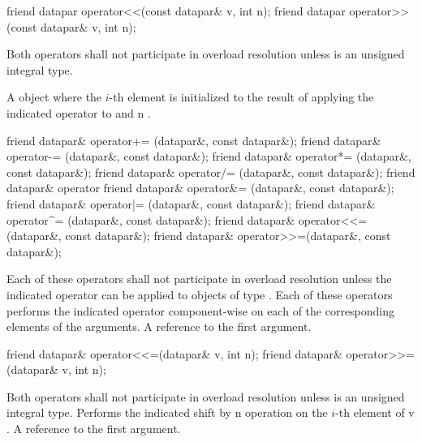 \begin{itemdecl}
friend datapar operator<<(const datapar& v, int n);
friend datapar operator>>(const datapar& v, int n);
\end{itemdecl}
\begin{itemdescr}
  \pnum\remarks Both operators shall not participate in overload resolution unless  is an unsigned integral type.

  \pnum\returns A \datapar object where the $i$-th element is initialized to the result of applying the indicated operator to  and \code n \foralli.
\end{itemdescr}

\begin{itemdecl}
friend datapar& operator+= (datapar&, const datapar&);
friend datapar& operator-= (datapar&, const datapar&);
friend datapar& operator*= (datapar&, const datapar&);
friend datapar& operator/= (datapar&, const datapar&);
friend datapar& operator%
friend datapar& operator&= (datapar&, const datapar&);
friend datapar& operator|= (datapar&, const datapar&);
friend datapar& operator^= (datapar&, const datapar&);
friend datapar& operator<<=(datapar&, const datapar&);
friend datapar& operator>>=(datapar&, const datapar&);
\end{itemdecl}
\begin{itemdescr}
  \pnum\remarks Each of these operators shall not participate in overload resolution unless the indicated operator can be applied to objects of type .
  \pnum\effects Each of these operators performs the indicated operator component-wise on each of the corresponding elements of the arguments.
  \pnum\returns A reference to the first argument.
\end{itemdescr}

\begin{itemdecl}
friend datapar& operator<<=(datapar& v, int n);
friend datapar& operator>>=(datapar& v, int n);
\end{itemdecl}
\begin{itemdescr}
  \pnum\remarks Both operators shall not participate in overload resolution unless  is an unsigned integral type.
  \pnum\effects Performs the indicated shift by \code n operation on the $i$-th element of \code v \foralli.
  \pnum\returns A reference to the first argument.
\end{itemdescr}

